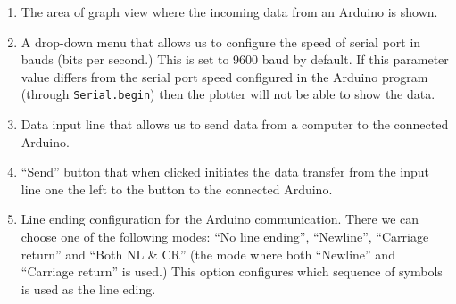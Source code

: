 \documentclass[../sparc.tex]{subfiles}
\begin{document}
\begin{enumerate}
\item The area of graph view where the incoming data from an Arduino is shown.
\item A drop-down menu that allows us to configure the speed of serial port in
  bauds (bits per second.)  This is set to 9600 baud by default.  If this
  parameter value differs from the serial port speed configured in the Arduino
  program (through \texttt{Serial.begin}) then the plotter will not be able to
  show the data.
\item Data input line that allows us to send data from a computer to the
  connected Arduino.
\item ``Send'' button that when clicked initiates the data transfer from the
  input line one the left to the button to the connected Arduino.
\item Line ending configuration for the Arduino communication.  There we can
  choose one of the following modes: ``No line ending'', ``Newline'', ``Carriage
  return'' and ``Both NL \& CR'' (the mode where both ``Newline'' and ``Carriage
  return'' is used.)  This option configures which sequence of symbols is used
  as the line eding.
\end{enumerate}
\end{document}
